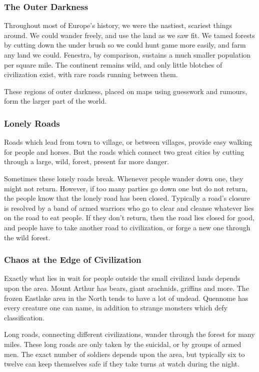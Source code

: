 \begin{multicols}{2}
\subsubsection{The Outer Darkness}

Throughout most of Europe's history, we were the nastiest, scariest things around.
We could wander freely, and use the land as we saw fit.
We tamed forests by cutting down the under brush so we could hunt game more easily, and farm any land we could.
Fenestra, by comparison, sustains a much smaller population per square mile.
The continent remains wild, and only little blotches of civilization exist, with rare roads running between them.

These regions of outer darkness, placed on maps using guesswork and rumours, form the larger part of the world.

\subsubsection{Lonely Roads}

Roads which lead from town to village, or between villages, provide easy walking for people and horses.
But the roads which connect two great cities by cutting through a large, wild, forest, present far more danger.

Sometimes these lonely roads break.
Whenever people wander down one, they might not return.
However, if too many parties go down one but do not return, the people know that the lonely road has been closed.
Typically a  road's closure is resolved by a band of armed warriors who go to clear and cleanse whatever lies on the road to eat people.
If they don't return, then the road lies closed for good, and people have to take another road to civilization, or forge a new one through the wild forest.

\subsubsection{Chaos at the Edge of Civilization}

Exactly what lies in wait for people outside the small civilized lands depends upon the area.
Mount Arthur has bears, giant arachnids, griffins and more.
The frozen Eastlake area in the North tends to have a lot of undead.
Quennome has every creature one can name, in addition to strange monsters which defy classification.

Long roads, connecting different civilizations, wander through the forest for many miles.
These long roads are only taken by the suicidal, or by groups of armed men.
The exact number of soldiers depends upon the area, but typically six to twelve can keep themselves safe if they take turns at watch during the night.


\end{multicols}
